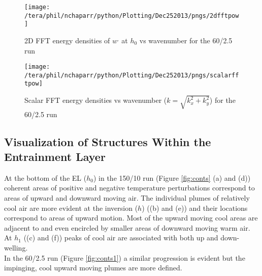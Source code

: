 \begin{figure}[htbp]
    \centering
    \texttt{[image: /tera/phil/nchaparr/python/Plotting/Dec252013/pngs/2dfftpow]}
    \caption{2D FFT energy densities of $w^{,}$ at $h_{0}$ vs wavenumber for the 60/2.5 run}
    \label{fig:scalardfftw602point5}   %
\end{figure}

\begin{figure}[htbp]
    \centering
    \texttt{[image: /tera/phil/nchaparr/python/Plotting/Dec252013/pngs/scalarfftpow]}
    \caption{Scalar FFT  energy densities vs wavenumber ($k = \sqrt{k_{x}^{2}+k_{y}^{2}}$) for the 60/2.5 run}
    \label{fig:2fftw602point5}   %
\end{figure}

\clearpage

\subsection{Visualization of Structures Within the Entrainment Layer}
\FloatBarrier
At the bottom of the \acs{EL} ($h_{0}$) in the 150/10 run (Figure \ref{fig:conts} (a) and (d)) coherent
areas of positive and negative temperature perturbations correspond to areas of upward and downward moving air.  
The individual plumes of relatively cool air are more evident at the inversion ($h$) ((b) and (e)) and their 
locations correspond to areas of upward motion.  Most of the upward moving cool areas are adjacent to and even 
encircled by smaller areas of downward moving warm air.  At $h_{1}$ ((c) and (f)) peaks of cool air are associated 
with both up and down-welling.\\  

In the 60/2.5 run (Figure \ref{fig:conts1}) a similar progression is evident but the impinging, cool upward moving
plumes are more defined.\\   

